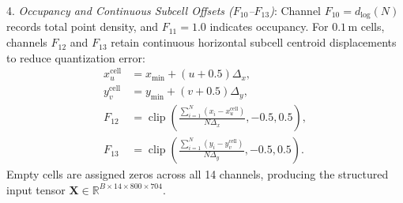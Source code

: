 4. \textit{Occupancy and Continuous Subcell Offsets ($F_{10}$--$F_{13}$)}: Channel $F_{10} = d_{\log}(N)$ records total point density, and $F_{11} = 1.0$ indicates occupancy. For $0.1$\,m cells, channels $F_{12}$ and $F_{13}$ retain continuous horizontal subcell centroid displacements to reduce quantization error:
\begin{align}
    x_u^{\mathrm{cell}} &= x_{\min} + (u + 0.5)\Delta_x, \nonumber\\
    y_v^{\mathrm{cell}} &= y_{\min} + (v + 0.5)\Delta_y, \nonumber\\
    F_{12} &= \operatorname{clip}\left(\frac{\sum_{i=1}^N (x_i - x_u^{\mathrm{cell}})}{N\Delta_x}, -0.5, 0.5\right), \nonumber\\
    F_{13} &= \operatorname{clip}\left(\frac{\sum_{i=1}^N (y_i - y_v^{\mathrm{cell}})}{N\Delta_y}, -0.5, 0.5\right).
    \label{eq:offset_encoding}
\end{align}
Empty cells are assigned zeros across all 14 channels, producing the structured input tensor $\mathbf{X} \in \mathbb{R}^{B \times 14 \times 800 \times 704}$.

